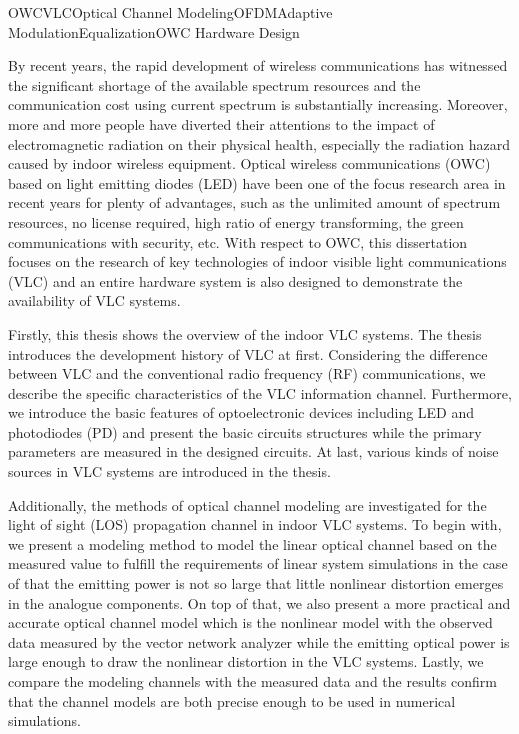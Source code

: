 
\begin{englishabstract}{OWC\quad{}VLC\quad{}Optical Channel Modeling\quad{}OFDM\quad{}Adaptive Modulation\quad{}Equalization\quad{}OWC Hardware Design}

By recent years, the rapid development of wireless communications has witnessed the significant shortage of the available spectrum resources and the communication cost using current spectrum is substantially increasing.
Moreover, more and more people have diverted their attentions to the impact of electromagnetic radiation on their physical health, especially the radiation hazard caused by indoor wireless equipment.
Optical wireless communications (OWC) based on light emitting diodes (LED) have been one of the focus research area in recent years for plenty of advantages, such as the unlimited amount of spectrum resources, no license required, high ratio of energy transforming, the green communications with security, etc.
With respect to OWC, this dissertation focuses on the research of key technologies of indoor visible light communications (VLC) and an entire hardware system is also designed to demonstrate the availability of VLC systems.

Firstly, this thesis shows the overview of the indoor VLC systems.
The thesis introduces the development history of VLC at first.
Considering the difference between VLC and the conventional radio frequency (RF) communications, we describe the specific characteristics of the VLC information channel.
Furthermore, we introduce the basic features of optoelectronic devices including LED and photodiodes (PD) and present the basic circuits structures while the primary parameters are measured in the designed circuits. At last, various kinds of noise sources in VLC systems are introduced in the thesis.

Additionally, the methods of optical channel modeling are investigated for the light of sight (LOS) propagation channel in indoor VLC systems.
To begin with, we present a modeling method to model the linear optical channel based on the measured value to fulfill the requirements of linear system simulations in the case of that the emitting power is not so large that little nonlinear distortion emerges in the analogue components.
On top of that, we also present a more practical and accurate optical channel model which is the nonlinear model with the observed data measured by the vector network analyzer while the emitting optical power is large enough to draw the nonlinear distortion in the VLC systems.
Lastly, we compare the modeling channels with the measured data and the results confirm that the channel models are both precise enough to be used in numerical simulations.


\end{englishabstract}
